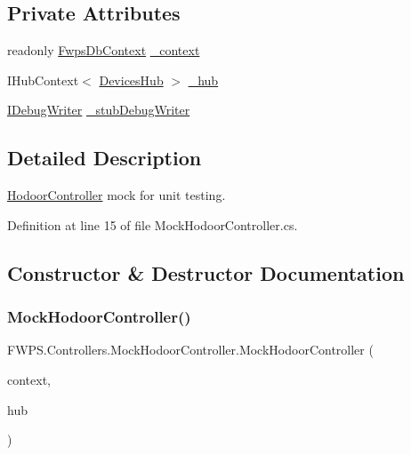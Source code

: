 \subsection*{Private Attributes}
\begin{DoxyCompactItemize}
\item 
readonly \mbox{\hyperlink{class_f_w_p_s_1_1_data_1_1_fwps_db_context}{Fwps\+Db\+Context}} \mbox{\hyperlink{class_f_w_p_s_1_1_controllers_1_1_mock_hodoor_controller_a90429641bb7747596322d77dff0f53c5}{\+\_\+context}}
\item 
I\+Hub\+Context$<$ \mbox{\hyperlink{class_f_w_p_s_1_1_devices_hub}{Devices\+Hub}} $>$ \mbox{\hyperlink{class_f_w_p_s_1_1_controllers_1_1_mock_hodoor_controller_acdb68b0a807969c42aae874cbadf3b99}{\+\_\+hub}}
\item 
\mbox{\hyperlink{interface_f_w_p_s_1_1_i_debug_writer}{I\+Debug\+Writer}} \mbox{\hyperlink{class_f_w_p_s_1_1_controllers_1_1_mock_hodoor_controller_adcda04d915f282e2b7552414620c34d7}{\+\_\+stub\+Debug\+Writer}}
\end{DoxyCompactItemize}


\subsection{Detailed Description}
\mbox{\hyperlink{class_f_w_p_s_1_1_controllers_1_1_hodoor_controller}{Hodoor\+Controller}} mock for unit testing. 

Definition at line 15 of file Mock\+Hodoor\+Controller.\+cs.



\subsection{Constructor \& Destructor Documentation}
\mbox{\label{class_f_w_p_s_1_1_controllers_1_1_mock_hodoor_controller_a806d4077ea51a5692392f90fb0da6384}} 
\subsubsection{\texorpdfstring{Mock\+Hodoor\+Controller()}{MockHodoorController()}}
{\footnotesize\ttfamily F\+W\+P\+S.\+Controllers.\+Mock\+Hodoor\+Controller.\+Mock\+Hodoor\+Controller (\begin{DoxyParamCaption}\item[{\mbox{\hyperlink{class_f_w_p_s_1_1_data_1_1_fwps_db_context}{Fwps\+Db\+Context}}}]{context,  }\item[{I\+Hub\+Context$<$ \mbox{\hyperlink{class_f_w_p_s_1_1_devices_hub}{Devices\+Hub}} $>$}]{hub }\end{DoxyParamCaption})}




